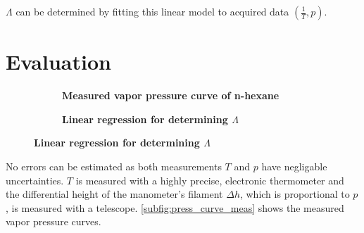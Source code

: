 $\Lambda$ can be determined by fitting this linear model to acquired data $(\frac{1}{T},p)$.

\section{Evaluation}
\begin{figure}[tbp]
	\centering
	\begin{subfigure}{0.4\textwidth}
		\centering
		\caption{\textbf{Measured vapor pressure curve of n-hexane}}
		\label{subfig:press_curve_meas}
	\end{subfigure}
	\begin{subfigure}{0.4\textwidth}
		\centering
		\caption{\textbf{Linear regression for determining $\Lambda$}}
		\label{subfig:lambda_meas}
	\end{subfigure}
\end{figure}

No errors can be estimated as both measurements $T$ and $p$ have negligable uncertainties.
$T$ is measured with a highly precise, electronic thermometer and the differential height of the manometer's filament $\Delta h$, which is proportional to $p$, is measured with a telescope.
\autoref{subfig:press_curve_meas} shows the measured vapor pressure curves.
